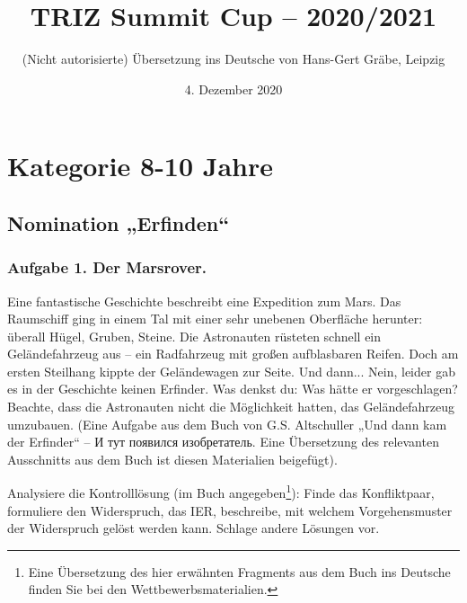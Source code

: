 \documentclass[11pt,a4paper]{article}
\title{TRIZ Summit Cup – 2020/2021}
\author{(Nicht autorisierte) Übersetzung ins Deutsche von Hans-Gert Gr\"abe,
  Leipzig}
\date{4. Dezember 2020}
\begin{document}
\maketitle
\tableofcontents
\enlargethispage{12em}
\clearpage
\section{Kategorie 8-10 Jahre}

\subsection{Nomination „Erfinden“}

\subsubsection*{Aufgabe 1. Der Marsrover.}
Eine fantastische Geschichte beschreibt eine Expedition zum Mars.  Das
Raumschiff ging in einem Tal mit einer sehr unebenen Oberfläche herunter:
überall Hügel, Gruben, Steine. Die Astronauten rüsteten schnell ein
Geländefahrzeug aus -- ein Radfahrzeug mit großen aufblasbaren Reifen. Doch am
ersten Steilhang kippte der Geländewagen zur Seite. Und dann... Nein, leider
gab es in der Geschichte keinen Erfinder. Was denkst du: Was hätte er
vorgeschlagen? Beachte, dass die Astronauten nicht die Möglichkeit hatten, das
Geländefahrzeug umzubauen.  (Eine Aufgabe aus dem Buch von G.S. Altschuller
„Und dann kam der Erfinder“ -- \foreignlanguage{russian}{И тут появился
  изобретатель}. Eine Übersetzung des relevanten Ausschnitts aus dem Buch ist
diesen Materialien beigefügt).

Analysiere die Kontrolllösung (im Buch angegeben\footnote{Eine Übersetzung des
  hier erwähnten Fragments aus dem Buch ins Deutsche finden Sie bei den
  Wettbewerbsmaterialien.}): Finde das Konfliktpaar, formuliere den
Widerspruch, das IER, beschreibe, mit welchem Vorgehensmuster der Widerspruch
gelöst werden kann. Schlage andere Lösungen vor.
\end{document}
